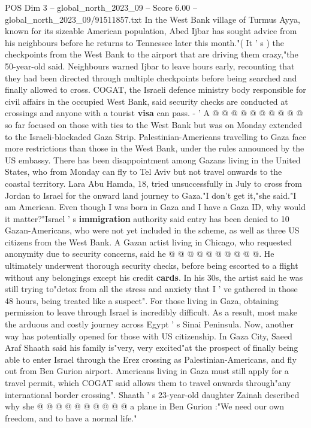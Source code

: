 \begin{textsample}{POS Dim 3 – global\_north\_2023\_09 – Score 6.00 – global\_north\_2023\_09/91511857.txt}
In the West Bank village of Turmus Ayya, known for its sizeable American population, Abed Ijbar has sought advice from his neighbours before he returns to Tennessee later this month."( It ' s ) the checkpoints from the West Bank to the airport that are driving them crazy,"the 50-year-old said.
Neighbours warned Ijbar to leave hours early, recounting that they had been directed through multiple checkpoints before being searched and finally allowed to cross.
COGAT, the Israeli defence ministry body responsible for civil affairs in the occupied West Bank, said security checks are conducted at crossings and anyone with a tourist \textbf{visa} can pass. - ' A @ @ @ @ @ @ @ @ @ @ so far focused on those with ties to the West Bank but was on Monday extended to the Israeli-blockaded Gaza Strip.
Palestinian-Americans travelling to Gaza face more restrictions than those in the West Bank, under the rules announced by the US embassy.
There has been disappointment among Gazans living in the United States, who from Monday can fly to Tel Aviv but not travel onwards to the coastal territory.
Lara Abu Hamda, 18, tried unsuccessfully in July to cross from Jordan to Israel for the onward land journey to Gaza."I don't get it,"she said."I am American.
Even though I was born in Gaza and I have a Gaza ID, why would it matter?"Israel ' s \textbf{immigration} authority said entry has been denied to 10 Gazan-Americans, who were not yet included in the scheme, as well as three US citizens from the West Bank.
A Gazan artist living in Chicago, who requested anonymity due to security concerns, said he @ @ @ @ @ @ @ @ @ @.
He ultimately underwent thorough security checks, before being escorted to a flight without any belongings except his credit \textbf{cards}.
In his 30s, the artist said he was still trying to"detox from all the stress and anxiety that I ' ve gathered in those 48 hours, being treated like a suspect".
For those living in Gaza, obtaining permission to leave through Israel is incredibly difficult.
As a result, most make the arduous and costly journey across Egypt ' s Sinai Peninsula.
Now, another way has potentially opened for those with US citizenship.
In Gaza City, Saeed Araf Shaath said his family is"very, very excited"at the prospect of finally being able to enter Israel through the Erez crossing as Palestinian-Americans, and fly out from Ben Gurion airport.
Americans living in Gaza must still apply for a travel permit, which COGAT said allows them to travel onwards through"any international border crossing".
Shaath ' s 23-year-old daughter Zainah described why she @ @ @ @ @ @ @ @ @ @ a plane in Ben Gurion :"We need our own freedom, and to have a normal life."

\end{textsample}
